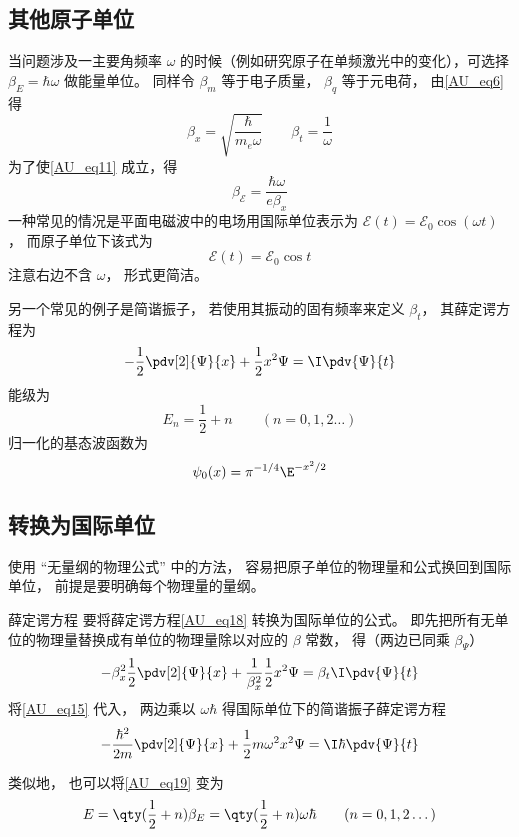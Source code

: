 \subsection{其他原子单位}

当问题涉及一主要角频率 $\omega$ 的时候（例如研究原子在单频激光中的变化），可选择 $\beta_E = \hbar\omega$ 做能量单位。 同样令 $\beta_m$ 等于电子质量， $\beta_q$ 等于元电荷， 由\autoref{AU_eq6} 得
\begin{equation}\label{AU_eq15}
\beta_x = \sqrt{\frac{\hbar}{m_e\omega}}
\qquad
\beta_t = \frac{1}{\omega}
\end{equation}
为了使\autoref{AU_eq11} 成立，得
\begin{equation}
\beta_\mathcal{E} = \frac{\hbar\omega}{e \beta_x}
\end{equation}
一种常见的情况是平面电磁波中的电场用国际单位表示为 $\mathcal{E}(t) = \mathcal{E}_0\cos(\omega t)$， 而原子单位下该式为
\begin{equation}
\mathcal{E}(t) = \mathcal{E}_0\cos t
\end{equation}
注意右边不含 $\omega$， 形式更简洁。

另一个常见的例子是简谐振子， 若使用其振动的固有频率来定义 $\beta_t$， 其薛定谔方程为
\begin{equation}\label{AU_eq18}
-\frac12 \pdv[2]{\Psi}{x} + \frac12 x^2 \Psi= \I\pdv{\Psi}{t}
\end{equation}
能级为
\begin{equation}\label{AU_eq19}
E_n = \frac12 + n \qquad (n = 0, 1, 2\dots)
\end{equation}
归一化的基态波函数为
\begin{equation}
\psi_0(x) = \pi^{-1/4} \E^{-x^2/2}
\end{equation}

\subsection{转换为国际单位}
使用 “无量纲的物理公式” 中的方法， 容易把原子单位的物理量和公式换回到国际单位， 前提是要明确每个物理量的量纲。

\begin{example}{薛定谔方程}
要将薛定谔方程\autoref{AU_eq18} 转换为国际单位的公式。 即先把所有无单位的物理量替换成有单位的物理量除以对应的 $\beta$ 常数， 得（两边已同乘 $\beta_\Psi$）
\begin{equation}
-\beta_x^2\frac12 \pdv[2]{\Psi}{x} + \frac{1}{\beta_x^2}\frac12 x^2 \Psi= \beta_t\I\pdv{\Psi}{t}
\end{equation}
将\autoref{AU_eq15} 代入， 两边乘以 $\omega\hbar$ 得国际单位下的简谐振子薛定谔方程
\begin{equation}
-\frac{\hbar^2}{2m} \pdv[2]{\Psi}{x} + \frac12 m\omega^2 x^2 \Psi= \I\hbar\pdv{\Psi}{t}
\end{equation}

类似地， 也可以将\autoref{AU_eq19} 变为
\begin{equation}
E =  \qty(\frac12 + n)\beta_E = \qty(\frac12 + n)\omega\hbar \qquad (n = 0, 1, 2\dots)
\end{equation}
\end{example}
